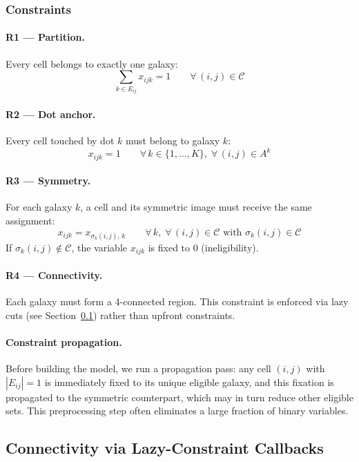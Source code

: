 \subsubsection{Constraints}

\paragraph{R1 — Partition.} Every cell belongs to exactly one galaxy:
\[
  \sum_{k \in E_{ij}} x_{ijk} = 1
  \qquad
  \forall\,(i,j)\in\mathcal{C}
\]

\paragraph{R2 — Dot anchor.} Every cell touched by dot $k$ must belong to galaxy $k$:
\[
  x_{ijk} = 1
  \qquad
  \forall\,k\in\{1,\ldots,K\},
  \;
  \forall\,(i,j)\in A^k
\]

\paragraph{R3 — Symmetry.} For each galaxy $k$, a cell and its symmetric image must receive the same assignment:
\[
  x_{ijk} = x_{\sigma_k(i,j),\,k}
  \qquad
  \forall\,k,
  \;
  \forall\,(i,j)\in\mathcal{C}
  \text{ with }
  \sigma_k(i,j)\in\mathcal{C}
\]
If $\sigma_k(i,j)\notin\mathcal{C}$, the variable $x_{ijk}$ is fixed to 0 (ineligibility).

\paragraph{R4 — Connectivity.} Each galaxy must form a 4-connected region. This constraint is enforced via lazy cuts (see Section~\ref{sec:connectivity}) rather than upfront constraints.

\paragraph{Constraint propagation.} Before building the model, we run a propagation pass: any cell $(i,j)$ with $|E_{ij}|=1$ is immediately fixed to its unique eligible galaxy, and this fixation is propagated to the symmetric counterpart, which may in turn reduce other eligible sets. This preprocessing step often eliminates a large fraction of binary variables.

\subsection{Connectivity via Lazy-Constraint Callbacks}
\label{sec:connectivity}

